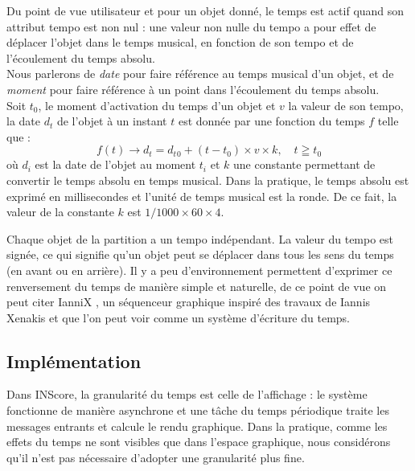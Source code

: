 \documentclass{article}
\begin{document}
Du point de vue utilisateur et pour un objet donné, le temps est actif quand son attribut tempo est non nul : une valeur non nulle du tempo a pour effet de déplacer l'objet dans le temps musical, en fonction de son tempo et de l'écoulement du temps absolu. \\
Nous parlerons de \emph{date} pour faire référence au temps musical d'un objet, et de \emph{moment} pour faire référence à un point dans l'écoulement du temps absolu. \\

Soit $t_0$, le moment d'activation du temps d'un objet et $v$ la valeur de son tempo, la date $d_t$ de l'objet à un instant $t$ est donnée par une fonction du temps $f$ telle que :
\begin{equation}
	 f(t) \to d_t = d_t{_0} + (t - t_0) \times v \times k , \quad t \geqq t_0
\label{timeeq}
\end{equation}
où $d_i$ est la date de l'objet au moment $t_i$ et $k$ une constante permettant de convertir le temps absolu en temps musical. Dans la pratique, le temps absolu est exprimé en millisecondes et l'unité de temps musical est la ronde. De ce fait, la valeur de la constante $k$ est $1 / 1000 \times 60 \times 4$.

Chaque objet de la partition a un tempo indépendant. La valeur du tempo est signée, ce qui signifie qu'un objet peut se déplacer dans tous les sens du temps (en avant ou en arrière). Il y a peu d'environnement permettent d'exprimer ce renversement du temps de manière simple et naturelle, de ce point de vue on peut citer IanniX \cite{iannix14}, un séquenceur graphique inspiré des travaux de Iannis Xenakis et que l'on peut voir comme un système d'écriture du temps.

\subsection{Implémentation}

Dans INScore, la granularité du temps est celle de l'affichage : le système fonctionne de manière asynchrone et une tâche du temps périodique traite les messages entrants et calcule le rendu graphique. Dans la pratique, comme les effets du temps ne sont visibles que dans l'espace graphique, nous considérons qu'il n'est pas nécessaire d'adopter une granularité plus fine. 
\end{document}
